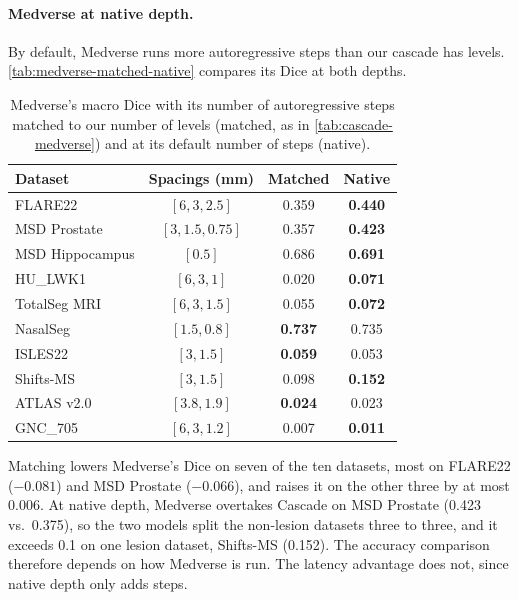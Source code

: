 \paragraph{Medverse at native depth.}
By default, Medverse runs more autoregressive steps than our cascade has
levels. \autoref{tab:medverse-matched-native} compares its Dice at both
depths.

\begin{table}[t]
  \centering
  \small
  \caption{Medverse's macro Dice with its number of autoregressive steps
  matched to our number of levels (matched, as in
  \autoref{tab:cascade-medverse}) and at its default number of steps
  (native).}
  \label{tab:medverse-matched-native}
  \begin{tabular}{@{}lccc@{}}
    \toprule
    Dataset & Spacings (mm) & Matched & Native \\
    \midrule
    FLARE22         & $[6, 3, 2.5]$    & 0.359 & \textbf{0.440} \\
    MSD Prostate    & $[3, 1.5, 0.75]$ & 0.357 & \textbf{0.423} \\
    MSD Hippocampus & $[0.5]$          & 0.686 & \textbf{0.691} \\
    HU\_LWK1        & $[6, 3, 1]$      & 0.020 & \textbf{0.071} \\
    TotalSeg MRI    & $[6, 3, 1.5]$    & 0.055 & \textbf{0.072} \\
    NasalSeg        & $[1.5, 0.8]$     & \textbf{0.737} & 0.735 \\
    \midrule
    ISLES22         & $[3, 1.5]$       & \textbf{0.059} & 0.053 \\
    Shifts-MS       & $[3, 1.5]$       & 0.098 & \textbf{0.152} \\
    ATLAS v2.0      & $[3.8, 1.9]$     & \textbf{0.024} & 0.023 \\
    GNC\_705        & $[6, 3, 1.2]$    & 0.007 & \textbf{0.011} \\
    \bottomrule
  \end{tabular}
\end{table}

Matching lowers Medverse's Dice on seven of the ten datasets, most on FLARE22
($-0.081$) and MSD Prostate ($-0.066$), and raises it on the other three by at
most 0.006. At native depth, Medverse overtakes Cascade on MSD Prostate (0.423
vs.\ 0.375), so the two models split the non-lesion datasets three to three,
and it exceeds 0.1 on one lesion dataset, Shifts-MS (0.152). The accuracy
comparison therefore depends on how Medverse is run. The latency advantage
does not, since native depth only adds steps.

